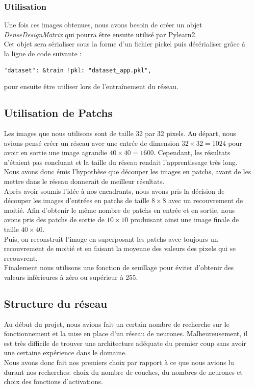 \documentclass[12pt, a4paper]{article}
\begin{document}
		\subsubsection{Utilisation}
Une fois ces images obtenues, nous avons besoin de créer un objet \emph{DenseDesignMatrix} qui pourra être ensuite utilisé par Pylearn2.\\ Cet objet sera  sérialiser sous la forme d'un fichier pickel puis désérialiser grâce à la ligne de code suivante : \begin{verbatim}
"dataset": &train !pkl: "dataset_app.pkl",
\end{verbatim}
pour ensuite être utiliser lors de l’entraînement du réseau. 

 
	\subsection{Utilisation de Patchs}
Les images que nous utilisons sont de taille 32 par 32 pixels. Au départ, nous avions pensé créer un réseau avec une entrée de dimension $32 \times 32 = 1024$ pour avoir en sortie une image agrandie $40 \times 40 = 1600$. Cependant, les résultats n'étaient pas concluant et la taille du réseau rendait l'apprentissage très long. Nous avons donc émis l'hypothèse que découper les images en patchs, avant de les mettre dans le réseau donnerait de meilleur résultats.
\\

Après avoir soumis l'idée à nos encadrants, nous avons pris la décision de découper les images d'entrées en patchs de taille $8 \times 8$ avec un recouvrement de moitié. Afin d'obtenir le même nombre de patchs en entrée et en sortie, nous avons pris des patchs de sortie de $10 \times 10$ produisant ainsi une image finale de taille $40 \times 40$.\\ Puis, on reconstruit l'image en superposant les patchs avec toujours un recouvrement de moitié et en faisant la moyenne des valeurs des pixels qui se recouvrent. 
\\

Finalement nous utilisons une fonction de seuillage pour éviter d'obtenir des valeurs inférieures à zéro ou supérieur à 255.

	\subsection{Structure du réseau}
Au début du projet, nous avions fait un certain nombre de recherche sur le fonctionnement et la mise en place d'un réseau de neurones. Malheureusement, il est très difficile de trouver une architecture adéquate du premier coup sans avoir une certaine expérience dans le domaine. \\
Nous avons donc fait nos premiers choix par rapport à ce que nous avions lu durant nos recherches: choix du nombre de couches, du nombres de neurones et choix des fonctions d'activations. 
\end{document}
